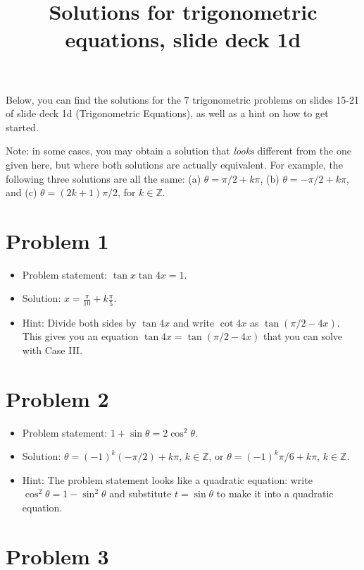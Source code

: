 \documentclass{amsart}
\title{Solutions for trigonometric equations, slide deck 1d}
\begin{document}
\maketitle

Below, you can find the solutions for the 7 trigonometric problems on slides
15-21 of slide deck 1d (Trigonometric Equations), as well as a hint on how to
get started.

Note: in some cases, you may obtain a solution that \emph{looks} different from the one given here, but where both solutions are actually equivalent. For example, the following three solutions are all the same: (a) $\theta = \pi/2 + k\pi$, (b) $\theta = - \pi/2 + k \pi$, and (c) $\theta = (2k + 1) \pi/2$, for $k \in \mathbb{Z}$.

\section*{Problem 1}

\begin{itemize}
  \item Problem statement: $\tan x \tan 4x = 1$.
  \item Solution: $x = \frac{\pi}{10} + k \frac{\pi}{5}$.
  \item Hint: Divide both sides by $\tan 4x$ and write $\cot 4x$ as $\tan \left( \pi/2 - 4x\right)$. This gives you an equation $\tan 4x = \tan (\pi/2 - 4x)$ that you can solve with Case III.
  \end{itemize}  

\section*{Problem 2}

\begin{itemize}
  \item Problem statement: $1 + \sin \theta = 2\cos^2\theta$.
  \item Solution: $\theta = (-1)^k (-\pi/2) + k \pi$, $k \in \mathbb{Z}$, or $\theta = (-1)^k \pi/6 + k \pi$, $k \in \mathbb{Z}$.
  \item Hint: The problem statement looks like a quadratic equation: write $\cos^2 \theta = 1 - \sin^2 \theta$ and substitute $t = \sin \theta$ to make it into a quadratic equation.
  \end{itemize}  

\section*{Problem 3}
\end{document}
